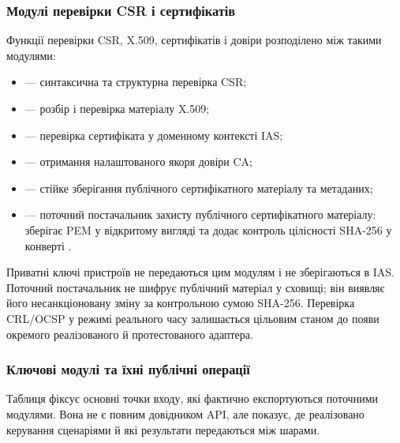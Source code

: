 \documentclass{article}
\begin{document}
\subsubsection{Модулі перевірки CSR і сертифікатів}
Функції перевірки CSR, X.509, сертифікатів і довіри розподілено між такими модулями:
\begin{itemize}
    \item {} --- синтаксична та структурна перевірка CSR;
    \item {} --- розбір і перевірка матеріалу X.509;
    \item {} --- перевірка сертифіката у доменному контексті IAS;
    \item {} --- отримання налаштованого якоря довіри CA;
    \item {} --- стійке зберігання публічного сертифікатного матеріалу та метаданих;
    \item {} --- поточний постачальник захисту публічного сертифікатного матеріалу: зберігає PEM у відкритому вигляді та додає контроль цілісності SHA-256 у конверті .
\end{itemize}
Приватні ключі пристроїв не передаються цим модулям і не зберігаються в IAS. Поточний постачальник  не шифрує публічний матеріал у сховищі; він виявляє його несанкціоновану зміну за контрольною сумою SHA-256. Перевірка CRL/OCSP у режимі реального часу залишається цільовим станом до появи окремого реалізованого й протестованого адаптера.

\subsubsection{Ключові модулі та їхні публічні операції}
Таблиця фіксує основні точки входу, які фактично експортуються поточними модулями. Вона не є повним довідником API, але показує, де реалізовано керування сценаріями й які результати передаються між шарами.
\end{document}
